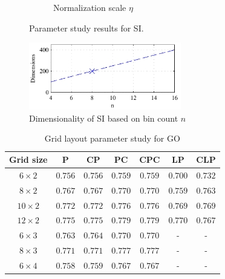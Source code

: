 \documentclass[thesis.tex]{subfiles}
\begin{document}
\begin{figure}[p]
{\begin{subfigure}[t]{0.593\textwidth}
		\caption{Normalization scale $\eta$}
		\label{fig:dtuParametersSi_normSigma}
		\vspace{2mm}
	\end{subfigure}}
	\caption{Parameter study results for SI.}
	\label{fig:dtuParametersGoAuc}
	\vspace{1cm}
	\includegraphics[width=0.593\textwidth]{img/dtuParametersSi_binCountDims.pdf}
	\caption{Dimensionality of SI based on bin count $n$}
	\label{fig:dtuParametersSiDims}
\end{figure}
%
%
\begin{table}[tb]
\centering
\begin{tabular}{ c c c c c c c }
\toprule
Grid size & P & CP & PC & CPC & LP & CLP \\ \midrule
$6 \times 2$ & $0.756$ & $0.756$ & $0.759$ & $0.759$ & $0.700$ & $0.732$ \\ 
$8 \times 2$ & $0.767$ & $0.767$ & $0.770$ & $0.770$ & $0.759$ & $0.763$ \\ 
$10 \times 2$ & $0.772$ & $0.772$ & $0.776$ & $0.776$ & $0.769$ & $0.769$ \\ 
$12 \times 2$ & $0.775$ & $0.775$ & $\mathbf{0.779}$ & $0.779$ & $0.770$ & $0.767$ \\ 
$6 \times 3$ & $0.763$ & $0.764$ & $0.770$ & $0.770$ & - & - \\ 
$8 \times 3$ & $0.771$ & $0.771$ & $0.777$ & $0.777$ & - & - \\ 
$6 \times 4$ & $0.758$ & $0.759$ & $0.767$ & $0.767$ & - & - \\ 
\bottomrule
\end{tabular}
\caption{Grid layout parameter study for GO}
\label{tbl:dtuLayoutParametersGo}
\end{table}
\end{document}
